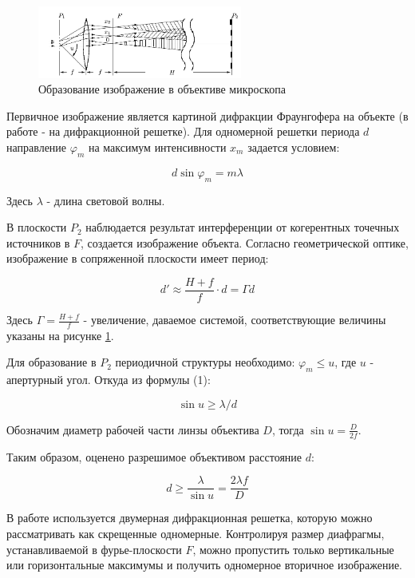 \documentclass[12pt]{kiarticle} %
\begin{document}
	\begin{figure}[h]
		\centering	
		\includegraphics[width=0.6\textwidth]{abbe.png}
		\caption{Образование изображение в объективе микроскопа}
		\label{abbe}
	\end{figure}
	
	Первичное изображение является картиной дифракции Фраунгофера на объекте (в работе - на дифракционной решетке). Для одномерной решетки периода $d$ направление $\varphi_m$ на максимум интенсивности $x_m$ задается условием: 
	
	\begin{equation}
		d\sin\varphi_m = m\lambda
	\end{equation} 
	
	Здесь $\lambda$ - длина световой волны. 
	
	В плоскости $P_2$ наблюдается результат интерференции от когерентных точечных источников в $F$, создается изображение объекта. Согласно геометрической оптике, изображение в сопряженной плоскости имеет период: 
	
	\begin{equation}
		d' \approx \frac{H + f}{f} \cdot d = \Gamma d
	\end{equation}
	
	Здесь $\Gamma = \frac{H+f}{f}$ - увеличение, даваемое системой, соответствующие величины указаны на рисунке \ref{abbe}. 
	
	Для образование в $P_2$ периодичной структуры необходимо: $\varphi_m \le u$, где $u$ - апертурный угол. Откуда из формулы (1): 
	
	\[ \sin u \ge \lambda/d \]
	
	Обозначим диаметр рабочей части линзы объектива $D$, тогда $\sin u = \frac{D}{2f}$.
	
	Таким образом, оценено разрешимое объективом расстояние $d$:
	
	\begin{equation}
		d \ge \frac{\lambda}{\sin u} = \frac{2\lambda f}{D}
	\end{equation} 
	
	В работе используется двумерная дифракционная решетка, которую можно рассматривать как скрещенные одномерные. Контролируя размер диафрагмы, устанавливаемой в фурье-плоскости $F$, можно пропустить только вертикальные или горизонтальные максимумы и получить одномерное вторичное изображение. 
	
\end{document}
